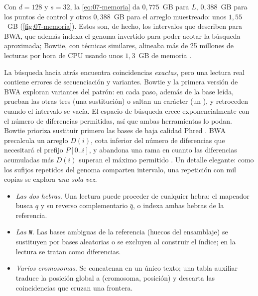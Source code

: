 Con $d=128$ y $s=32$, la \cref{eq:07-memoria} da $0{,}775$~GB para $L$, $0{,}388$~GB para los puntos de control y otros $0{,}388$~GB para el arreglo muestreado: unos $1{,}55$~GB (\cref{fig:07-memoria}). Estos son, de hecho, los intervalos que describen \textcite{c07-li2009bwa} para BWA, que además indexa el genoma invertido para poder acotar la búsqueda aproximada; Bowtie, con técnicas similares, alineaba más de 25 millones de lecturas por hora de CPU usando unos $1{,}3$~GB de memoria \parencite{c07-langmead2009}.

\begin{profundizacion}
La búsqueda hacia atrás encuentra coincidencias \emph{exactas}, pero una lectura real contiene errores de secuenciación y variantes. Bowtie y la primera versión de BWA exploran variantes del patrón: en cada paso, además de la base leída, prueban las otras tres (una sustitución) o saltan un carácter (un ), y retroceden cuando el intervalo se vacía. El espacio de búsqueda crece exponencialmente con el número de diferencias permitidas, así que ambas herramientas lo podan. Bowtie prioriza sustituir primero las bases de baja calidad Phred \parencite{c07-langmead2009}. BWA precalcula un arreglo $D(i)$, cota inferior del número de diferencias que necesitará el prefijo $P[0..i]$, y abandona una rama en cuanto las diferencias acumuladas más $D(i)$ superan el máximo permitido \parencite{c07-li2009bwa}. Un detalle elegante: como los sufijos repetidos del genoma comparten intervalo, una repetición con mil copias se explora \emph{una sola vez}.
\end{profundizacion}

\begin{cuidado}
\begin{itemize}
  \item \emph{Las dos hebras}. Una lectura puede proceder de cualquier hebra: el mapeador busca $q$ y su reverso complementario $\bar q$, o indexa ambas hebras de la referencia.
  \item \emph{Las \texttt{N}}. Las bases ambiguas de la referencia (huecos del ensamblaje) se sustituyen por bases aleatorias o se excluyen al construir el índice; en la lectura se tratan como diferencias.
  \item \emph{Varios cromosomas}. Se concatenan en un único texto; una tabla auxiliar traduce la posición global a (cromosoma, posición) y descarta las coincidencias que cruzan una frontera.
\end{itemize}
\end{cuidado}

